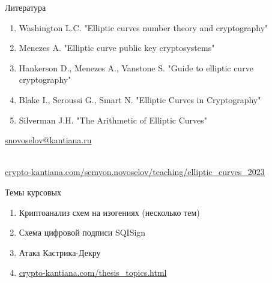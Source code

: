 \documentclass{beamer}
\begin{document}
\begin{frame}{Литература}
\begin{enumerate}
    \item Washington L.C. "Elliptic curves number theory and cryptography"%
    \item Menezes A. "Elliptic curve public key cryptosystems"
    \item Hankerson D., Menezes A., Vanstone S. "Guide to elliptic curve cryptography"
    \item Blake I., Seroussi G., Smart N. "Elliptic Curves in Cryptography"
    \item Silverman J.H. "The Arithmetic of Elliptic Curves"%
\end{enumerate}


\begin{center}
    \begin{tcolorbox}[enhanced,hbox,colback=block-green-color-bg,colframe=subsection-color!120,title=Контакты,center title]
        \begin{varwidth}{\textwidth}
            \begin{center}
                \href{mailto:snovoselov@kantiana.ru}{snovoselov@kantiana.ru}
            \end{center}
        \end{varwidth}
    \end{tcolorbox}	
\end{center}

\\
{\footnotesize
    \href{https://crypto-kantiana.com/semyon.novoselov/teaching/elliptic_curves_2023}{crypto-kantiana.com/semyon.novoselov/teaching/elliptic\_curves\_2023}
}
\end{frame}

\begin{frame}{Темы курсовых}
	\begin{enumerate}
		\item Криптоанализ схем на изогениях (несколько тем)
		\item Схема цифровой подписи SQISign
		\item Атака Кастрика-Декру
		\item \url{crypto-kantiana.com/thesis_topics.html}
	\end{enumerate}
\end{frame}
\end{document}
